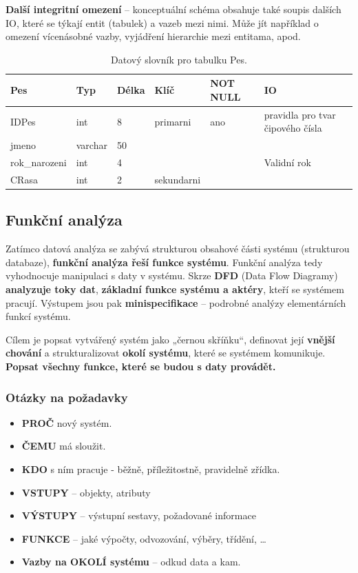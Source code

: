 \textbf{Další integritní omezení} -- konceptuální schéma obsahuje také soupis dalších IO, které se týkají entit (tabulek) a vazeb mezi nimi. Může jít například o omezení vícenásobné vazby, vyjádření hierarchie mezi entitama, apod. 

\begin{table}[H]
	\centering
	\begin{tabular}{|l|l|l|l|l|l|}
		\hline
		\textbf{Pes} & \textbf{Typ} & \textbf{Délka} & \textbf{Klíč} & \textbf{NOT NULL} & \textbf{IO}                      \\ \hline
		IDPes        & int          & 8              & primarni      & ano               & pravidla pro tvar čipového čísla \\ \hline
		jmeno        & varchar      & 50             &               &                   &                                  \\ \hline
		rok_narozeni & int          & 4              &               &                   & Validní rok                      \\ \hline
		CRasa        & int          & 2              & sekundarni    &                   &                                  \\ \hline
	\end{tabular}
\caption{Datový slovník pro tabulku Pes.}
\end{table}

\subsection{Funkční analýza}
Zatímco datová analýza se zabývá strukturou obsahové části systému (strukturou databaze), \textbf{funkční analýza řeší funkce systému}. Funkční analýza tedy vyhodnocuje manipulaci s daty v systému. Skrze \textbf{DFD} (Data Flow Diagramy) \textbf{analyzuje toky dat}, \textbf{základní funkce systému a aktéry}, kteří se systémem pracují. Výstupem jsou pak \textbf{minispecifikace} -- podrobné analýzy elementárních funkcí systému. 

Cílem je popsat vytvářený systém jako „černou skříňku“, definovat její \textbf{vnější chování} a strukturalizovat \textbf{okolí systému}, které se systémem komunikuje. \textbf{Popsat všechny funkce, které se budou s daty provádět.}

\subsubsection*{Otázky na požadavky}
\begin{itemize}
\item\textbf{PROČ} nový systém. 
\item\textbf{ČEMU} má sloužit. 
\item\textbf{KDO} s ním pracuje - běžně, příležitostně, pravidelně zřídka. 
\item\textbf{VSTUPY} – objekty, atributy 
\item\textbf{VÝSTUPY} – výstupní sestavy, požadované informace 
\item\textbf{FUNKCE} – jaké výpočty, odvozování, výběry, třídění, \ldots
\item\textbf{Vazby na OKOLÍ systému} – odkud data a kam.
\end{itemize}


